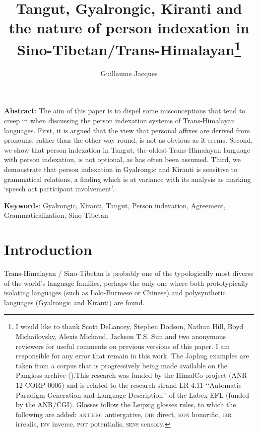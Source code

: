 \documentclass[oldfontcommands,oneside,a4paper,11pt]{article}
\begin{document}
 
\title{Tangut, Gyalrongic, Kiranti and the nature of person indexation in Sino-Tibetan/Trans-Himalayan\footnote{I would like to thank Scott DeLancey, Stephen Dodson, Nathan Hill, Boyd Michailovsky, Alexis Michaud, Jackson T.S. Sun and two anonymous reviewers for useful comments on previous versions of this paper. I am responsible for any error that remain in this work. The Japhug examples are taken from a corpus that is progressively being made available on the Pangloss archive (\citealt{michailovsky14pangloss}).This research was funded by the HimalCo project (ANR-12-CORP-0006) and is related to the research strand LR-4.11 ‘‘Automatic Paradigm Generation and Language Description’’ of the Labex EFL (funded by the ANR/CGI). Glosses follow the Leipzig glosses rules, to which the following are added: \textsc{antierg} antiergative, \textsc{dir} direct, \textsc{hon} honorific, \textsc{irr} irrealis, \textsc{inv} inverse, \textsc{pot} potentialis, \textsc{sens} sensory.}}
\author{Guillaume Jacques}
\maketitle

\textbf{Abstract}: The aim of this paper is to dispel some misconceptions that tend to creep in when discussing  the person indexation systems of Trans-Himalayan languages. First, it is argued that the view that personal affixes are derived from pronouns, rather than the other way round, is not as obvious as it seems. Second, we show that person indexation in Tangut, the oldest Trans-Himalayan language with person indexation, is not optional, as has often been assumed. Third, we demonstrate that person indexation in Gyalrongic and Kiranti is sensitive to grammatical relations, a finding which is at variance with its analysis as marking `speech act participant involvement'.

\textbf{Keywords}: Gyalrongic, Kiranti, Tangut, Person indexation, Agreement, Grammaticalization, Sino-Tibetan

\section{Introduction}
Trans-Himalayan / Sino-Tibetan is probably one of the typologically most diverse of the world's language families, perhaps the only one where both prototypically isolating languages (such as Lolo-Burmese or Chinese) and polysynthetic languages (Gyalrongic and Kiranti) are found. 
\end{document}
